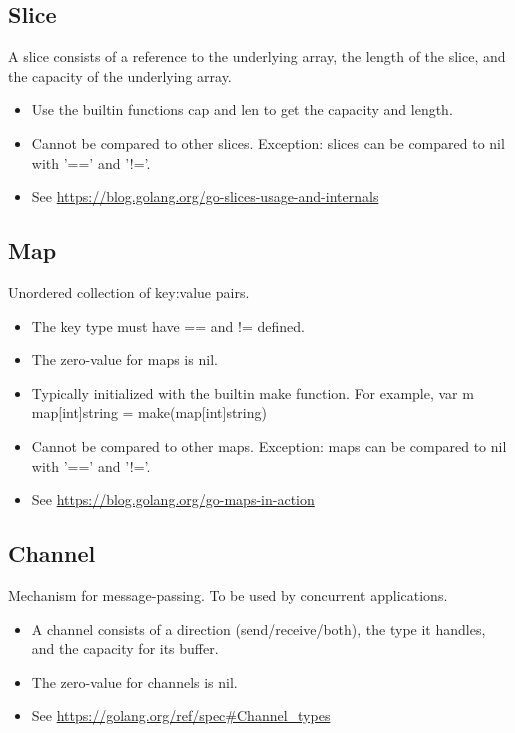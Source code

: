 \documentclass{article}
\begin{document}
	\subsection{Slice}
		A slice consists of a reference to the underlying array, the length of the slice, and the capacity of the underlying array. 				
		\begin{itemize}
			\item Use the builtin functions \colorbox{code}{cap} and \colorbox{code}{len} to get the capacity and length.
			\item Cannot be compared to other slices. Exception: slices can be compared to \colorbox{code}{nil} with '==' and '!='.
			\item See \url{https://blog.golang.org/go-slices-usage-and-internals}
		\end{itemize}
				
	\subsection{Map}
		Unordered collection of key:value pairs. 
		\begin{itemize}
			\item The key type must have \colorbox{code}{==} and \colorbox{code}{!=} defined. 
			\item The zero-value for maps is \colorbox{code}{nil}.
			\item Typically initialized with the builtin \colorbox{code}{make} function. For example, \colorbox{code}{var m map[int]string = make(map[int]string)}
			\item Cannot be compared to other maps. Exception: maps can be compared to \colorbox{code}{nil} with '==' and '!='.
			\item See \url{https://blog.golang.org/go-maps-in-action}
		\end{itemize}
		
	\subsection{Channel}
		Mechanism for message-passing. To be used by concurrent applications.
		\begin{itemize}
			\item A channel consists of a direction (send/receive/both), the type it handles, and the capacity for its buffer. 
			\item The zero-value for channels is \colorbox{code}{nil}.
			\item See \url{https://golang.org/ref/spec#Channel_types}
		\end{itemize}
\end{document}
